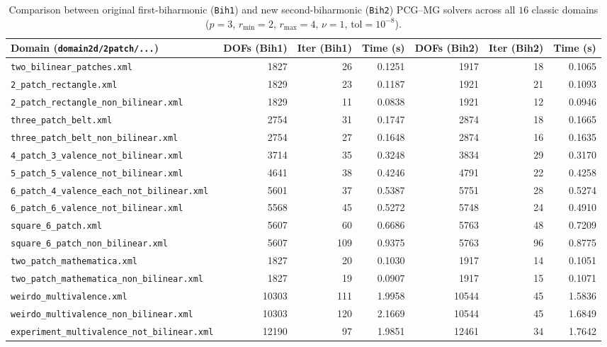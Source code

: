 \documentclass[11pt,a4paper]{article}
\begin{document}
\begin{table}[htbp]
\centering
\caption{Comparison between original first-biharmonic (\texttt{Bih1}) and new second-biharmonic (\texttt{Bih2}) PCG--MG solvers across all $16$ classic domains ($p=3$, $r_{\min}=2$, $r_{\max}=4$, $\nu=1$, $\mathrm{tol}=10^{-8}$).}
\label{tab:regression}
\footnotesize
\setlength{\tabcolsep}{4pt}
\begin{tabular}{lrrrrrr}
\toprule
Domain (\texttt{domain2d/2patch/...}) & DOFs (Bih1) & Iter (Bih1) & Time (s) & DOFs (Bih2) & Iter (Bih2) & Time (s) \\
\midrule
\texttt{two\_bilinear\_patches.xml}                 & 1827  & 26  & 0.1251 & 1917  & 18 & 0.1065 \\
\texttt{2\_patch\_rectangle.xml}                    & 1829  & 23  & 0.1187 & 1921  & 21 & 0.1093 \\
\texttt{2\_patch\_rectangle\_non\_bilinear.xml}       & 1829  & 11  & 0.0838 & 1921  & 12 & 0.0946 \\
\texttt{three\_patch\_belt.xml}                     & 2754  & 31  & 0.1747 & 2874  & 18 & 0.1665 \\
\texttt{three\_patch\_belt\_non\_bilinear.xml}        & 2754  & 27  & 0.1648 & 2874  & 16 & 0.1635 \\
\texttt{4\_patch\_3\_valence\_not\_bilinear.xml}        & 3714  & 35  & 0.3248 & 3834  & 29 & 0.3170 \\
\texttt{5\_patch\_5\_valence\_not\_bilinear.xml}        & 4641  & 38  & 0.4246 & 4791  & 22 & 0.4258 \\
\texttt{6\_patch\_4\_valence\_each\_not\_bilinear.xml}  & 5601  & 37  & 0.5387 & 5751  & 28 & 0.5274 \\
\texttt{6\_patch\_6\_valence\_not\_bilinear.xml}       & 5568  & 45  & 0.5272 & 5748  & 24 & 0.4910 \\
\texttt{square\_6\_patch.xml}                       & 5607  & 60  & 0.6686 & 5763  & 48 & 0.7209 \\
\texttt{square\_6\_patch\_non\_bilinear.xml}          & 5607  & 109 & 0.9375 & 5763  & 96 & 0.8775 \\
\texttt{two\_patch\_mathematica.xml}                & 1827  & 20  & 0.1030 & 1917  & 14 & 0.1051 \\
\texttt{two\_patch\_mathematica\_non\_bilinear.xml}   & 1827  & 19  & 0.0907 & 1917  & 15 & 0.1071 \\
\texttt{weirdo\_multivalence.xml}                   & 10303 & 111 & 1.9958 & 10544 & 45 & 1.5836 \\
\texttt{weirdo\_multivalence\_non\_bilinear.xml}      & 10303 & 120 & 2.1669 & 10544 & 45 & 1.6849 \\
\texttt{experiment\_multivalence\_not\_bilinear.xml}  & 12190 & 97  & 1.9851 & 12461 & 34 & 1.7642 \\
\bottomrule
\end{tabular}
\end{table}
\end{document}
